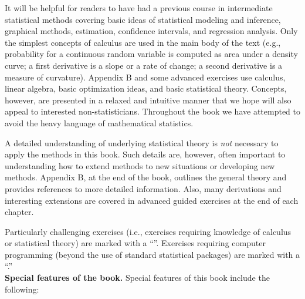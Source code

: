 It will be helpful for readers to have had a previous course in
intermediate statistical methods covering basic ideas of statistical
modeling and inference, graphical methods, estimation, confidence
intervals, and regression analysis.  Only the simplest concepts of
calculus are used in the main body of the text (e.g., probability for
a continuous random variable is computed as area under a density
curve; a first derivative is a slope or a rate of change; a second
derivative is a measure of curvature).  Appendix B and some
advanced exercises use calculus, linear algebra, basic optimization
ideas, and basic statistical theory. Concepts, however, are presented
in a relaxed and intuitive manner that we hope will also appeal to
interested non-statisticians. Throughout the book we have attempted to
avoid the heavy language of mathematical statistics.

A detailed understanding of underlying statistical theory is {\em not}
necessary to apply the methods in this book. Such details are,
however, often important to understanding how to extend methods to new
situations or developing new methods. Appendix B, at the end of the
book, outlines the general theory and provides references to more
detailed information.  Also, many derivations and interesting
extensions are covered in advanced guided exercises at the end of each
chapter.

Particularly challenging exercises (i.e., exercises requiring
knowledge of calculus or statistical theory) are marked with a
``\difficultexercise''. Exercises requiring computer programming
(beyond the use of standard statistical packages) are marked with a
``\computationalexercise.''\\[3ex]


\noindent
{\bf Special features of the book.}
Special features of this book include the following:


